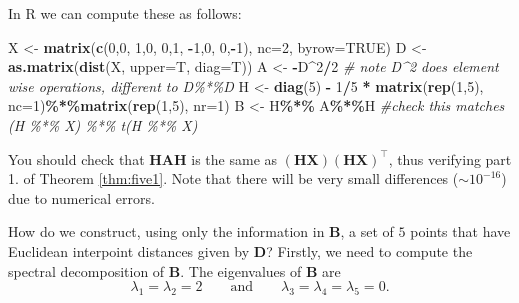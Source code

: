 \documentclass[
]{book}
\newenvironment{Shaded}{\begin{snugshade}}{\end{snugshade}}
\newcommand{\AttributeTok}[1]{\textcolor[rgb]{0.13,0.29,0.53}{#1}}
\newcommand{\CommentTok}[1]{\textcolor[rgb]{0.56,0.35,0.01}{\textit{#1}}}
\newcommand{\ConstantTok}[1]{\textcolor[rgb]{0.56,0.35,0.01}{#1}}
\newcommand{\DecValTok}[1]{\textcolor[rgb]{0.00,0.00,0.81}{#1}}
\newcommand{\FunctionTok}[1]{\textcolor[rgb]{0.13,0.29,0.53}{\textbf{#1}}}
\newcommand{\NormalTok}[1]{#1}
\newcommand{\OtherTok}[1]{\textcolor[rgb]{0.56,0.35,0.01}{#1}}
\newcommand{\SpecialCharTok}[1]{\textcolor[rgb]{0.81,0.36,0.00}{\textbf{#1}}}
\theoremstyle{definition}
\theoremstyle{definition}
\theoremstyle{definition}
\theoremstyle{definition}
\theoremstyle{remark}
\begin{document}
In R we can compute these as follows:

\begin{Shaded}
\begin{Highlighting}[]
\NormalTok{X }\OtherTok{\textless{}{-}} \FunctionTok{matrix}\NormalTok{(}\FunctionTok{c}\NormalTok{(}\DecValTok{0}\NormalTok{,}\DecValTok{0}\NormalTok{,}
              \DecValTok{1}\NormalTok{,}\DecValTok{0}\NormalTok{,}
              \DecValTok{0}\NormalTok{,}\DecValTok{1}\NormalTok{,}
              \SpecialCharTok{{-}}\DecValTok{1}\NormalTok{,}\DecValTok{0}\NormalTok{,}
              \DecValTok{0}\NormalTok{,}\SpecialCharTok{{-}}\DecValTok{1}\NormalTok{), }\AttributeTok{nc=}\DecValTok{2}\NormalTok{, }\AttributeTok{byrow=}\ConstantTok{TRUE}\NormalTok{)}
\NormalTok{D }\OtherTok{\textless{}{-}} \FunctionTok{as.matrix}\NormalTok{(}\FunctionTok{dist}\NormalTok{(X, }\AttributeTok{upper=}\NormalTok{T, }\AttributeTok{diag=}\NormalTok{T))}
\NormalTok{A }\OtherTok{\textless{}{-}} \SpecialCharTok{{-}}\NormalTok{D}\SpecialCharTok{\^{}}\DecValTok{2}\SpecialCharTok{/}\DecValTok{2} 
\CommentTok{\# note D\^{}2 does element wise operations, different to D\%*\%D}
\NormalTok{H }\OtherTok{\textless{}{-}} \FunctionTok{diag}\NormalTok{(}\DecValTok{5}\NormalTok{) }\SpecialCharTok{{-}} \DecValTok{1}\SpecialCharTok{/}\DecValTok{5} \SpecialCharTok{*} \FunctionTok{matrix}\NormalTok{(}\FunctionTok{rep}\NormalTok{(}\DecValTok{1}\NormalTok{,}\DecValTok{5}\NormalTok{), }\AttributeTok{nc=}\DecValTok{1}\NormalTok{)}\SpecialCharTok{\%*\%}\FunctionTok{matrix}\NormalTok{(}\FunctionTok{rep}\NormalTok{(}\DecValTok{1}\NormalTok{,}\DecValTok{5}\NormalTok{), }\AttributeTok{nr=}\DecValTok{1}\NormalTok{)}
\NormalTok{B }\OtherTok{\textless{}{-}}\NormalTok{ H}\SpecialCharTok{\%*\%}\NormalTok{ A}\SpecialCharTok{\%*\%}\NormalTok{H }\CommentTok{\#check this matches  (H \%*\% X) \%*\% t(H \%*\% X)}
\end{Highlighting}
\end{Shaded}

You should check that \(\mathbf H\mathbf A\mathbf H\) is the same as \((\mathbf H\mathbf X)(\mathbf H\mathbf X)^\top\), thus verifying part 1. of Theorem \ref{thm:five1}. Note that there will be very small differences (\(\sim 10^{-16}\)) due to numerical errors.

How do we construct, using only the information in \(\mathbf B\), a set of \(5\) points that have Euclidean interpoint distances given by \(\mathbf D\)?
Firstly, we need to compute the spectral decomposition of \(\mathbf B\). The eigenvalues of \(\mathbf B\) are
\[
\lambda_1=\lambda_2=2 \qquad \text{and} \qquad \lambda_3=\lambda_4=\lambda_5=0.
\]
\end{document}
